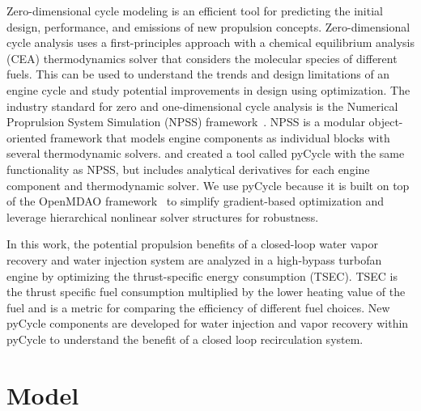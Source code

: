 \documentclass[12pt]{article}
\begin{document}
Zero-dimensional cycle modeling is an efficient tool for predicting the initial design, performance, and emissions of new propulsion concepts.
Zero-dimensional cycle analysis uses a first-principles approach with a chemical equilibrium analysis (CEA) thermodynamics solver that considers the molecular species of different fuels.
This can be used to understand the trends and design limitations of an engine cycle and study potential improvements in design using optimization.
The industry standard for zero and one-dimensional cycle analysis is the Numerical Proprulsion System Simulation (NPSS) framework~\cite{JonesNPSS}.
NPSS is a modular object-oriented framework that models engine components as individual blocks with several thermodynamic solvers.
\citet{Hendricks2019} and \citet{Gray2017b} created a tool called pyCycle with the same functionality as NPSS, but includes analytical derivatives for each engine component and thermodynamic solver.
We use pyCycle because it is built on top of the OpenMDAO framework~\cite{Gray2019a} to simplify gradient-based optimization and leverage hierarchical nonlinear solver structures for robustness.

In this work, the potential propulsion benefits of a closed-loop water vapor recovery and water injection system are analyzed in a high-bypass turbofan engine by optimizing the thrust-specific energy consumption (TSEC).
TSEC is the thrust specific fuel consumption multiplied by the lower heating value of the fuel and is a metric for comparing the efficiency of different fuel choices.
New pyCycle components are developed for water injection and vapor recovery within pyCycle to understand the benefit of a closed loop recirculation system.

\section{Model}
\end{document}
